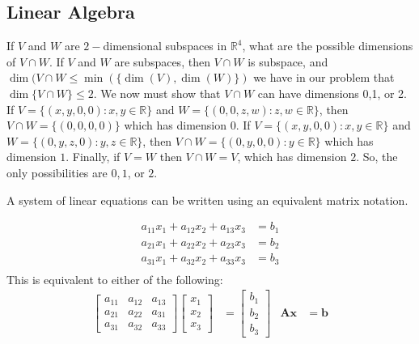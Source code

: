 \documentclass[crop=false,class=book,oneside]{standalone}
\begin{document}
    \subsection{Linear Algebra}
        \begin{lexample}
            If $V$ and $W$ are $2-$dimensional subspaces in
            $\mathbb{R}^{4}$, what are the possible dimensions of
            $V\cap W$. If $V$ and $W$ are subspaces, then
            ${V}\cap{W}$ is subspace, and
            $\dim({V}\cap{W}\leq\min(\{\dim(V),\dim(W)\})$
            we have in our problem that $\dim\{V\cap W\}\leq 2$. We
            now must show that $V\cap W$ can have dimensions 0,1, or
            2. If $V=\{(x,y,0,0):x,y\in\mathbb{R}\}$ and
            $W=\{(0,0,z,w):z,w\in \mathbb{R}\}$, then
            ${V}\cap{W}=\{(0,0,0,0)\}$ which has dimension $0$.
            If $V=\{(x,y,0,0):x,y\in\mathbb{R}\}$ and
            $W=\{(0,y,z,0):y,z\in\mathbb{R}\}$,
            then ${V}\cap{W}=\{(0,y,0,0):y\in\mathbb{R}\}$
            which has dimension $1$. Finally, if $V=W$ then
            ${V}\cap{W}=V$, which has dimension $2$. So, the only
            possibilities are $0,1$, or $2$.
        \end{lexample}
        A system of linear equations can be written
        using an equivalent matrix notation.
        \begin{example}
            \begin{align*}
                a_{11}x_{1}+a_{12}x_{2}+a_{13}x_{3}&=b_{1}\\
                a_{21}x_{1}+a_{22}x_{2}+a_{23}x_{3}&=b_{2}\\
                a_{31}x_{1}+a_{32}x_{2}+a_{33}x_{3}&=b_{3}\\
            \end{align*}
            This is equivalent to either of the following:
            \begin{align*}
                \begin{bmatrix}
                    a_{11}&a_{12}&a_{13}\\
                    a_{21}&a_{22}&a_{31}\\
                    a_{31}&a_{32}&a_{33}
                \end{bmatrix}
                \begin{bmatrix}
                    x_{1}\\
                    x_{2}\\
                    x_{3}
                \end{bmatrix}
                &=
                \begin{bmatrix}
                    b_{1}\\
                    b_{2}\\
                    b_{3}
                \end{bmatrix}
                &
                \mathbf{A}\mathbf{x}
                &=\mathbf{b}
            \end{align*}
        \end{example}
\end{document}
